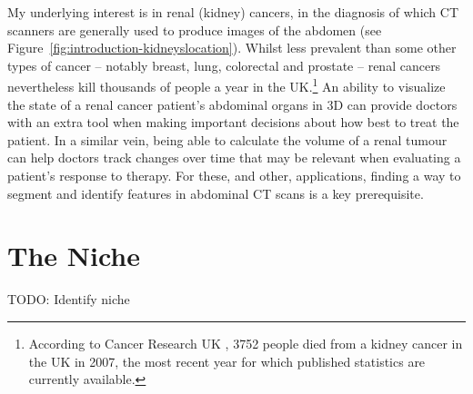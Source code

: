 My underlying interest is in renal (kidney) cancers, in the diagnosis of which CT scanners are generally used to produce images of the abdomen (see Figure~\ref{fig:introduction-kidneyslocation}). Whilst less prevalent than some other types of cancer -- notably breast, lung, colorectal and prostate -- renal cancers nevertheless kill thousands of people a year in the UK.\footnote{According to Cancer Research UK \cite{cruk-kidneycancermortality}, 3752 people died from a kidney cancer in the UK in 2007, the most recent year for which published statistics are currently available.} An ability to visualize the state of a renal cancer patient's abdominal organs in 3D can provide doctors with an extra tool when making important decisions about how best to treat the patient. In a similar vein, being able to calculate the volume of a renal tumour can help doctors track changes over time that may be relevant when evaluating a patient's response to therapy. For these, and other, applications, finding a way to segment and identify features in abdominal CT scans is a key prerequisite.

\section{The Niche}

TODO: Identify niche

\iffalse

